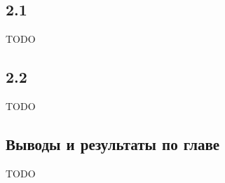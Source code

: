 \documentclass[../diploma.tex]{subfiles}
\begin{document}
\label{sec:2}

\subsection{2.1}

TODO

\subsection{2.2}

TODO

\subsection{Выводы и результаты по главе}

TODO
\end{document}
